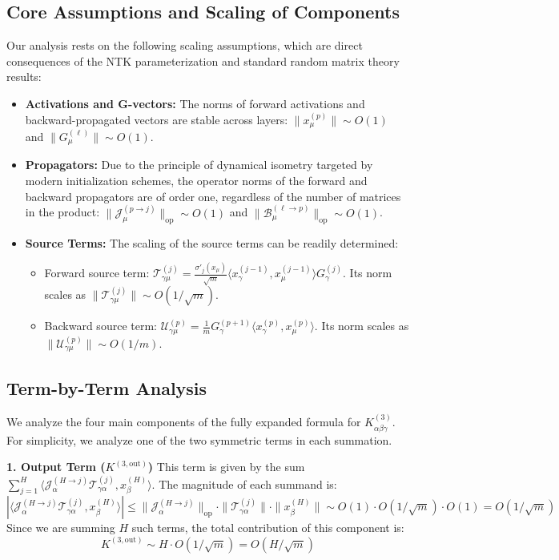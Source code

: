 \documentclass[a4paper]{article}
\begin{document}
\subsection{Core Assumptions and Scaling of Components}
Our analysis rests on the following scaling assumptions, which are direct consequences of the NTK parameterization and standard random matrix theory results:
\begin{itemize}
    \item \textbf{Activations and G-vectors:} The norms of forward activations and backward-propagated vectors are stable across layers: $\|x^{(p)}_\mu\| \sim O(1)$ and $\|G^{(\ell)}_\mu\| \sim O(1)$.
    \item \textbf{Propagators:} Due to the principle of dynamical isometry targeted by modern initialization schemes, the operator norms of the forward and backward propagators are of order one, regardless of the number of matrices in the product: $\|\mathcal{J}^{(p \to j)}_\mu\|_{\text{op}} \sim O(1)$ and $\|\mathcal{B}^{(\ell \to p)}_\mu\|_{\text{op}} \sim O(1)$.
    \item \textbf{Source Terms:} The scaling of the source terms can be readily determined:
    \begin{itemize}
        \item Forward source term: $\mathcal{T}^{(j)}_{\gamma\mu} = \frac{\sigma'_{j}(x_\mu)}{\sqrt{m}} \langle x^{(j-1)}_\gamma, x^{(j-1)}_\mu \rangle G^{(j)}_\gamma$. Its norm scales as $\|\mathcal{T}^{(j)}_{\gamma\mu}\| \sim O(1/\sqrt{m})$.
        \item Backward source term: $\mathcal{U}^{(p)}_{\gamma\mu} = \frac{1}{m} G^{(p+1)}_\gamma \langle x^{(p)}_\gamma, x^{(p)}_\mu \rangle$. Its norm scales as $\|\mathcal{U}^{(p)}_{\gamma\mu}\| \sim O(1/m)$.
    \end{itemize}
\end{itemize}

\subsection{Term-by-Term Analysis}
We analyze the four main components of the fully expanded formula for $K^{(3)}_{\alpha\beta\gamma}$. For simplicity, we analyze one of the two symmetric terms in each summation.

\textbf{1. Output Term ($K^{(3,\text{out})}$)}
This term is given by the sum $\sum_{j=1}^{H} \langle \mathcal{J}^{(H \to j)}_{\alpha} \mathcal{T}^{(j)}_{\gamma\alpha}, x^{(H)}_\beta \rangle$.
The magnitude of each summand is:
\[
|\langle \mathcal{J}^{(H \to j)}_{\alpha} \mathcal{T}^{(j)}_{\gamma\alpha}, x^{(H)}_\beta \rangle| \le \|\mathcal{J}^{(H \to j)}_{\alpha}\|_{\text{op}} \cdot \|\mathcal{T}^{(j)}_{\gamma\alpha}\| \cdot \|x^{(H)}_\beta\| \sim O(1) \cdot O(1/\sqrt{m}) \cdot O(1) = O(1/\sqrt{m})
\]
Since we are summing $H$ such terms, the total contribution of this component is:
\[
K^{(3,\text{out})} \sim H \cdot O(1/\sqrt{m}) = O(H/\sqrt{m})
\]
\end{document}
